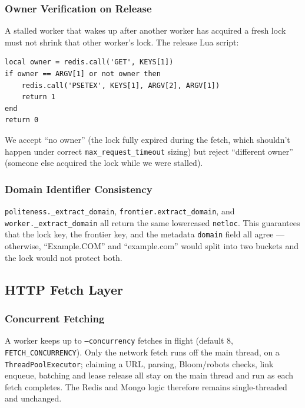 \documentclass[11pt,a4paper]{article}
\newcommand{\code}[1]{\texttt{#1}}
\begin{document}
\subsubsection{Owner Verification on Release}

A stalled worker that wakes up after another worker has acquired a fresh lock must not shrink that other worker's lock. The release Lua script:

\begin{lstlisting}
local owner = redis.call('GET', KEYS[1])
if owner == ARGV[1] or not owner then
    redis.call('PSETEX', KEYS[1], ARGV[2], ARGV[1])
    return 1
end
return 0
\end{lstlisting}

We accept ``no owner'' (the lock fully expired during the fetch, which shouldn't happen under correct \code{max\_request\_timeout} sizing) but reject ``different owner'' (someone else acquired the lock while we were stalled).

\subsubsection{Domain Identifier Consistency}

\code{politeness.\_extract\_domain}, \code{frontier.extract\_domain}, and \code{worker.\_extract\_domain} all return the same lowercased \code{netloc}. This guarantees that the lock key, the frontier key, and the metadata \code{domain} field all agree --- otherwise, ``Example.COM'' and ``example.com'' would split into two buckets and the lock would not protect both.

\subsection{HTTP Fetch Layer}
\label{sec:fetch}

\subsubsection{Concurrent Fetching}

A worker keeps up to \code{--concurrency} fetches in flight (default 8, \code{FETCH\_CONCURRENCY}). Only the network fetch runs off the main thread, on a \code{ThreadPoolExecutor}; claiming a URL, parsing, Bloom/robots checks, link enqueue, batching and lease release all stay on the main thread and run as each fetch completes. The Redis and Mongo logic therefore remains single-threaded and unchanged.
\end{document}

